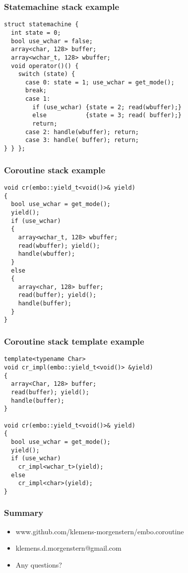 \documentclass{beamer}
\begin{document}
\begin{frame}[fragile]
\frametitle{Statemachine stack example}
\begin{block}{}
\begin{lstlisting}[basicstyle=\small]
struct statemachine {
  int state = 0;
  bool use_wchar = false;
  array<char, 128> buffer;
  array<wchar_t, 128> wbuffer;
  void operator()() {
    switch (state) {
      case 0: state = 1; use_wchar = get_mode(); 
      break;
      case 1: 
        if (use_wchar) {state = 2; read(wbuffer);}
        else           {state = 3; read( buffer);}
        return;
      case 2: handle(wbuffer); return; 
      case 3: handle( buffer); return;
} } };
\end{lstlisting}
\end{block}
\end{frame}

\begin{frame}[fragile]
\frametitle{Coroutine stack example}
\begin{block}{}
\begin{lstlisting}[basicstyle=\small]
void cr(embo::yield_t<void()>& yield)
{
  bool use_wchar = get_mode();
  yield();
  if (use_wchar)
  {
    array<wchar_t, 128> wbuffer;
    read(wbuffer); yield();
    handle(wbuffer);
  }
  else
  {
    array<char, 128> buffer;
    read(buffer); yield();
    handle(buffer);
  }
}
\end{lstlisting}
\end{block}
\end{frame}

\begin{frame}[fragile]
\frametitle{Coroutine stack template example}
\begin{block}{}
\begin{lstlisting}[basicstyle=\small]
template<typename Char>
void cr_impl(embo::yield_t<void()> &yield)
{
  array<Char, 128> buffer;
  read(buffer); yield();
  handle(buffer);
}

void cr(embo::yield_t<void()>& yield)
{
  bool use_wchar = get_mode();
  yield();
  if (use_wchar)
    cr_impl<wchar_t>(yield);
  else
    cr_impl<char>(yield);
}
\end{lstlisting}
\end{block}
\end{frame}

\begin{frame}
\frametitle{Summary}
\begin{itemize}
\item<1-> www.github.com/klemens-morgenstern/embo.coroutine
\item<2-> klemens.d.morgenstern@gmail.com
\item<3-> Any questions?
\end{itemize}

\end{frame}
\end{document}
